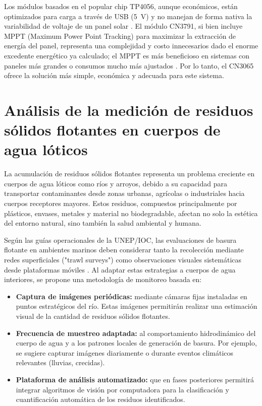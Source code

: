 Los módulos basados en el popular chip TP4056, aunque económicos, están optimizados para carga a través de USB (\SI{5}{\volt}) y no manejan de forma nativa la variabilidad de voltaje de un panel solar \cite{chipTP4056}. El módulo CN3791, si bien incluye MPPT (Maximum Power Point Tracking) para maximizar la extracción de energía del panel, representa una complejidad y costo innecesarios dado el enorme excedente energético ya calculado; el MPPT es más beneficioso en sistemas con paneles más grandes o consumos mucho más ajustados \cite{chipCN3791}. Por lo tanto, el CN3065 ofrece la solución más simple, económica y adecuada para este sistema.



\section{Análisis de la medición de residuos sólidos flotantes en cuerpos de agua lóticos}

La acumulación de residuos sólidos flotantes representa un problema creciente en cuerpos de agua lóticos como ríos y arroyos, debido a su capacidad para transportar contaminantes desde zonas urbanas, agrícolas o industriales hacia cuerpos receptores mayores. Estos residuos, compuestos principalmente por plásticos, envases, metales y material no biodegradable, afectan no solo la estética del entorno natural, sino también la salud ambiental y humana.

Según las guías operacionales de la UNEP/IOC, las evaluaciones de basura flotante en ambientes marinos deben considerar tanto la recolección mediante redes superficiales ("trawl surveys") como observaciones visuales sistemáticas desde plataformas móviles \cite{cheshire2009directrices}. Al adaptar estas estrategias a cuerpos de agua interiores, se propone una metodología de monitoreo basada en:

\begin{itemize}
    \item \textbf{Captura de imágenes periódicas:} mediante cámaras fijas instaladas en puntos estratégicos del río. Estas imágenes permitirán realizar una estimación visual de la cantidad de residuos sólidos flotantes.
    \item \textbf{Frecuencia de muestreo adaptada:} al comportamiento hidrodinámico del cuerpo de agua y a los patrones locales de generación de basura. Por ejemplo, se sugiere capturar imágenes diariamente o durante eventos climáticos relevantes (lluvias, crecidas).
    \item \textbf{Plataforma de análisis automatizado:} que en fases posteriores permitirá integrar algoritmos de visión por computadora para la clasificación y cuantificación automática de los residuos identificados.
\end{itemize}

